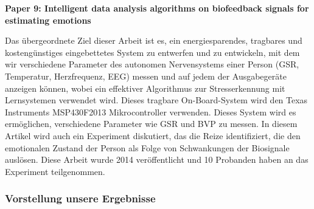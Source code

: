 \textbf{Paper 9: Intelligent data analysis algorithms on biofeedback signals for estimating emotions}

Das übergeordnete Ziel dieser Arbeit ist es, ein energiesparendes, tragbares und kostengünstiges eingebettetes System zu entwerfen und zu entwickeln, mit dem wir verschiedene Parameter des autonomen Nervensystems einer Person (GSR, Temperatur, Herzfrequenz, EEG) messen und auf jedem der Ausgabegeräte anzeigen können, wobei ein effektiver Algorithmus zur Stresserkennung mit Lernsystemen verwendet wird. 
Dieses tragbare On-Board-System wird den Texas Instruments MSP430F2013 Mikrocontroller verwenden. 
Dieses System wird es ermöglichen, verschiedene Parameter wie GSR und BVP zu messen. 
In diesem Artikel wird auch ein Experiment diskutiert, das die Reize identifiziert, die den emotionalen Zustand der Person als Folge von Schwankungen der Biosignale auslösen. 
Diese Arbeit wurde 2014 veröffentlicht und 10 Probanden haben an das Experiment teilgenommen. \\


\subsubsection{Vorstellung unsere Ergebnisse}

